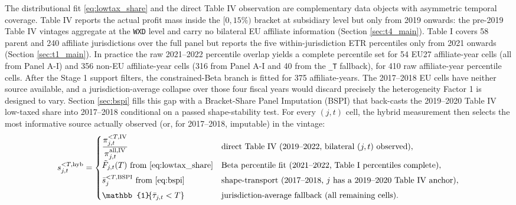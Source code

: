\documentclass[11pt,a4paper]{article}
\newcommand{\code}[1]{\texttt{#1}}
\begin{document}
The distributional fit \eqref{eq:lowtax_share} and the direct Table IV observation are complementary data objects with asymmetric temporal coverage. Table IV reports the actual profit mass inside the $[0, 15\%)$ bracket at subsidiary level but only from 2019 onwards: the pre-2019 Table IV vintages aggregate at the \code{WXD} level and carry no bilateral EU affiliate information (Section \ref{sec:t4_main}). Table I covers 58 parent and 240 affiliate jurisdictions over the full panel but reports the five within-jurisdiction ETR percentiles only from 2021 onwards (Section \ref{sec:t1_main}). In practice the raw 2021--2022 percentile overlap yields a complete percentile set for 54 EU27 affiliate-year cells (all from Panel A-I) and 356 non-EU affiliate-year cells (316 from Panel A-I and 40 from the \code{\_T} fallback), for 410 raw affiliate-year percentile cells. After the Stage 1 support filters, the constrained-Beta branch is fitted for 375 affiliate-years. The 2017--2018 EU cells have neither source available, and a jurisdiction-average collapse over those four fiscal years would discard precisely the heterogeneity Factor 1 is designed to vary. Section \ref{sec:bspi} fills this gap with a Bracket-Share Panel Imputation (BSPI) that back-casts the 2019--2020 Table IV low-taxed share into 2017--2018 conditional on a passed shape-stability test. For every $(j, t)$ cell, the hybrid measurement then selects the most informative source actually observed (or, for 2017--2018, imputable) in the vintage:
\begin{equation}\label{eq:hybrid}
s_{j,t}^{<T,\text{hyb}} = \begin{cases}
\dfrac{\pi_{j,t}^{<T,\text{IV}}}{\pi_{j,t}^{\text{all,IV}}} & \text{direct Table IV (2019--2022, bilateral $(j,t)$ observed)}, \\[8pt]
\tilde{F}_{j,t}(T) \text{ from \eqref{eq:lowtax_share}} & \text{Beta percentile fit (2021--2022, Table I percentiles complete)}, \\[4pt]
\bar{s}_{j}^{<T,\text{BSPI}} \text{ from \eqref{eq:bspi}} & \text{shape-transport (2017--2018, $j$ has a 2019--2020 Table IV anchor)}, \\[4pt]
\mathbb{1}\!\{\bar{\tau}_{j,t} < T\} & \text{jurisdiction-average fallback (all remaining cells)}.
\end{cases}
\end{equation}
\end{document}
